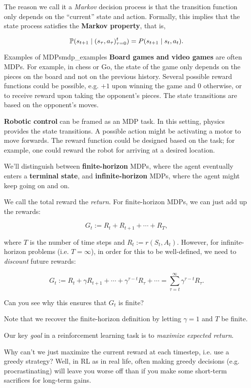 \documentclass[../main/main]{subfiles}
\begin{document}
The reason we call it a \emph{Markov} decision process is that the transition function only depends on the ``current'' state and action. Formally, this implies that the state process satisfies the \textbf{Markov property}, that is,

\[
    \P(s_{t+1} \mid (s_\tau, a_\tau)_{\tau=0}^t) = P(s_{t+1} \mid s_t, a_t).
\]

\begin{example}{Examples of MDPs}{mdp_examples}
    \textbf{Board games and video games} are often MDPs. For example, in chess or Go, the state of the game only depends on the pieces on the board and not on the previous history. Several possible reward functions could be possible, e.g. $+1$ upon winning the game and $0$ otherwise, or to receive reward upon taking the opponent's pieces. The state transitions are based on the opponent's moves.

    \textbf{Robotic control} can be framed as an MDP task. In this setting, physics provides the state transitions. A possible action might be activating a motor to move forwards. The reward function could be designed based on the task; for example, one could reward the robot for arriving at a desired location.
\end{example}

We'll distinguish between \textbf{finite-horizon} MDPs, where the agent eventually enters a \textbf{terminal state}, and \textbf{infinite-horizon} MDPs, where the agent might keep going on and on.

We call the total reward the \emph{return}. For finite-horizon MDPs, we can just add up the rewards:

\[
    G_t := R_t + R_{t+1} + \cdots + R_T,
\]

where $T$ is the number of time steps and $R_t := r(S_t, A_t)$. However, for infinite-horizon problems (i.e. $T = \infty$), in order for this to be well-defined, we need to \emph{discount} future rewards:

\[
    G_t := R_t + \gamma R_{t+1} + \cdots + \gamma^{\tau-t} R_{\tau} + \cdots = \sum_{\tau = t}^\infty \gamma^{\tau-t} R_\tau.
\]

Can you see why this ensures that $G_t$ is finite?

Note that we recover the finite-horizon definition by letting $\gamma = 1$ and $T$ be finite.

Our key \emph{goal} in a reinforcement learning task is to \emph{maximize expected return}.

Why can't we just maximize the current reward at each timestep, i.e. use a greedy strategy? Well, in RL as in real life, often making greedy decisions (e.g. procrastinating) will leave you worse off than if you make some short-term sacrifices for long-term gains.
\end{document}
